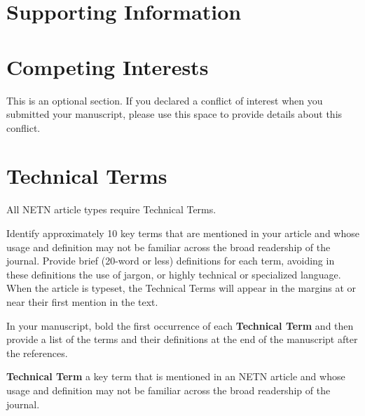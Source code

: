 \documentclass[NETN,manuscript]{stjour-new}
\begin{document}
\section{Supporting Information}



\section{Competing Interests}
This is an optional section. If you declared a conflict of interest when you submitted your manuscript, please  use this space to provide details about this conflict.



\section{Technical Terms}

All NETN article types require Technical Terms.

Identify approximately 10 key terms that are mentioned in your article and whose usage and definition may not be familiar across the broad readership of the journal. 
Provide brief (20-word or less) definitions for each term, avoiding in these definitions the use of jargon, or highly technical or specialized language. 
When the article is typeset, the Technical Terms will appear in the margins at or near their first mention in the text.

In your manuscript, bold the first occurrence of each \textbf{Technical Term} and then provide a list of the terms and their definitions at the end of the manuscript after the references. 

\textbf{Technical Term} a key term that is mentioned in an NETN article and whose usage and definition may not be familiar across the broad readership of the journal. 
\end{document}
